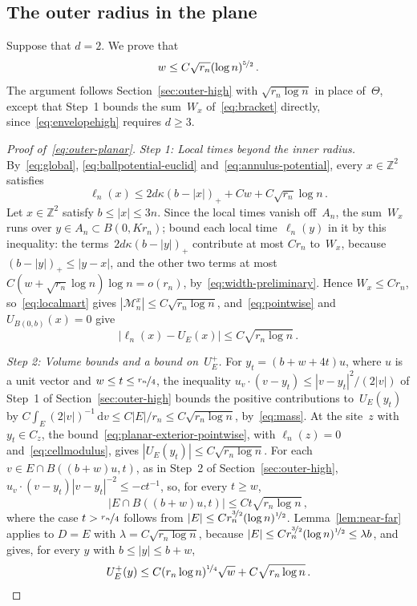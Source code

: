 \documentclass[11pt]{amsart}
\theoremstyle{plain}
\theoremstyle{definition}
\newcommand{\Z}{\mathbb Z}
\newcommand{\drift}{\kappa}
\newcommand{\dd}{\,\mathrm d}
\newcommand{\nf}{\nicefrac}
\numberwithin{equation}{section}
\begin{document}
\subsection{The outer radius in the plane}\label{sec:outer-planar}

Suppose that $d=2$. We prove that
\begin{equation}\label{eq:outer-planar}
w\leq C\sqrt{r_n}(\log n)^{\nf52}\, .
\end{equation}
The argument follows Section~\ref{sec:outer-high} with $\sqrt{r_n\log n}$ in place of~$\Theta$, except that Step~1 bounds the sum~$W_x$ of~\eqref{eq:bracket} directly, since~\eqref{eq:envelopehigh} requires $d\geq3$.

\begin{proof}[Proof of~\eqref{eq:outer-planar}]
\emph{Step 1: Local times beyond the inner radius.} By~\eqref{eq:global}, \eqref{eq:ballpotential-euclid} and~\eqref{eq:annulus-potential}, every $x\in\Z^2$ satisfies
\begin{equation*}
\ell_n(x)\leq2d\drift(b-|x|)_++Cw+C\sqrt{r_n}\log n\, .
\end{equation*}
Let $x\in\Z^2$ satisfy $b\leq|x|\leq3n$. Since the local times vanish off~$A_n$, the sum~$W_x$ runs over $y\in A_n\subset B(0,Kr_n)$; bound each local time~$\ell_n(y)$ in it by this inequality: the terms~$2d\drift(b-|y|)_+$ contribute at most $Cr_n$ to~$W_x$, because $(b-|y|)_+\leq|y-x|$, and the other two terms at most $C(w+\sqrt{r_n}\log n)\log n=o(r_n)$, by~\eqref{eq:width-preliminary}. Hence $W_x\leq Cr_n$, so~\eqref{eq:localmart} gives $|\mathcal M_n^x|\leq C\sqrt{r_n\log n}$, and~\eqref{eq:pointwise} and $U_{B(0,b)}(x)=0$ give
\begin{equation}\label{eq:planar-exterior-pointwise}
|\ell_n(x)-U_E(x)|\leq C\sqrt{r_n\log n}\, .
\end{equation}

\emph{Step 2: Volume bounds and a bound on~$U_E^+$.} For $y_t=(b+w+4t)u$, where $u$ is a unit vector and $w\leq t\leq\nf{r_n}{4}$, the inequality $u_v\cdot(v-y_t)\leq|v-y_t|^2/(2|v|)$ of Step~1 of Section~\ref{sec:outer-high} bounds the positive contributions to~$U_E(y_t)$ by $C\int_E(2|v|)^{-1}\dd v\leq C|E|/r_n\leq C\sqrt{r_n\log n}$, by~\eqref{eq:mass}. At the site~$z$ with $y_t\in C_z$, the bound~\eqref{eq:planar-exterior-pointwise}, with $\ell_n(z)=0$ and~\eqref{eq:cellmodulus}, gives $|U_E(y_t)|\leq C\sqrt{r_n\log n}$. For each $v\in E\cap B((b+w)u,t)$, as in Step~2 of Section~\ref{sec:outer-high}, $u_v\cdot(v-y_t)|v-y_t|^{-2}\leq-ct^{-1}$, so, for every $t\geq w$,
\begin{equation*}
|E\cap B((b+w)u,t)|\leq Ct\sqrt{r_n\log n}\, ,
\end{equation*}
where the case $t>\nf{r_n}{4}$ follows from $|E|\leq Cr_n^{\nf32}(\log n)^{\nf12}$. Lemma~\ref{lem:near-far} applies to $D=E$ with $\lambda=C\sqrt{r_n\log n}$, because $|E|\leq Cr_n^{\nf32}(\log n)^{\nf12}\leq\lambda b$, and gives, for every $y$ with $b\leq|y|\leq b+w$,
\begin{equation}\label{eq:planar-positive-bound}
U_E^+(y)\leq C(r_n\log n)^{\nf14}\sqrt w+C\sqrt{r_n\log n}\, .
\end{equation}


\end{proof}
\end{document}
